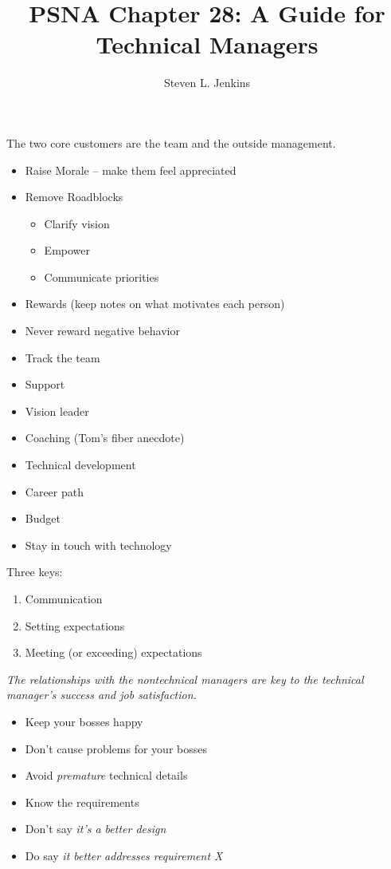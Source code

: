 \documentclass{slides}
\title{PSNA Chapter 28: A Guide for Technical Managers}
\author{Steven L. Jenkins}
\newcommand{\bi}{\begin{itemize}}
\newcommand{\ei}{\end{itemize}}
\newcommand{\be}{\begin{enumerate}}
\newcommand{\ee}{\end{enumerate}}
\begin{document}

The two core customers are the team and the outside management.  


\bi
\item Raise Morale -- make them feel appreciated
\item Remove Roadblocks
	\bi
	\item Clarify vision
	\item Empower
	\item Communicate priorities
	\ei
\item Rewards (keep notes on what motivates each person)
\item Never reward negative behavior
\item Track the team
\ei


\bi
\item Support
\item Vision leader
\item Coaching (Tom's fiber anecdote)
\item Technical development
\item Career path
\item Budget
\item Stay in touch with technology
\ei


Three keys:

\be
\item Communication
\item Setting expectations
\item Meeting (or exceeding) expectations
\ee

\emph{The relationships with the nontechnical managers are key to
the technical manager's success and job satisfaction.}


\bi
\item Keep your bosses happy 
\item Don't cause problems for your bosses
\item Avoid \emph{premature} technical details
\item Know the requirements
\item Don't say \emph{it's a better design}
\item Do say \emph{it better addresses requirement X}
\ei

\end{document}
